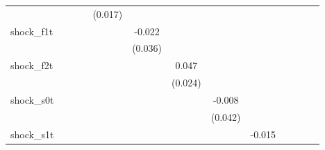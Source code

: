 {\begin{tabular}{l*{12}{c}}
            &                     &                     &                     &     (0.017)         &                     &                     &                     &                     &                     &                     &                     &                     \\
\addlinespace
shock\_f1t   &                     &                     &                     &                     &      -0.022         &                     &                     &                     &                     &                     &                     &                     \\
            &                     &                     &                     &                     &     (0.036)         &                     &                     &                     &                     &                     &                     &                     \\
\addlinespace
shock\_f2t   &                     &                     &                     &                     &                     &       0.047\sym{*}  &                     &                     &                     &                     &                     &                     \\
            &                     &                     &                     &                     &                     &     (0.024)         &                     &                     &                     &                     &                     &                     \\
\addlinespace
shock\_s0t   &                     &                     &                     &                     &                     &                     &      -0.008         &                     &                     &                     &                     &                     \\
            &                     &                     &                     &                     &                     &                     &     (0.042)         &                     &                     &                     &                     &                     \\
\addlinespace
shock\_s1t   &                     &                     &                     &                     &                     &                     &                     &      -0.015         &                     &                     &                     &                     \\

\end{tabular}}
